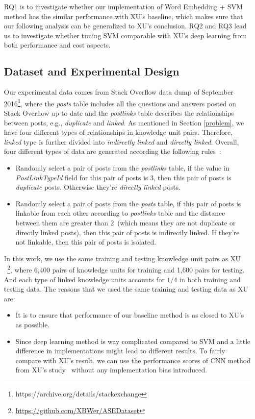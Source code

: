 \documentclass[sigconf]{acmart}
\theoremstyle{break}
\newcommand{\bi}{\begin{itemize}[leftmargin=0.4cm]}
\newcommand{\ei}{\end{itemize}}
\begin{document}
 RQ1 is to investigate whether our implementation of Word Embedding + SVM method has
 the similar performance with XU's baseline, which makes sure that our following 
 analysis can be generalized to XU's conclusion. RQ2 and RQ3 lead us to
 investigate whether tuning SVM comparable with XU's deep learning from both 
 performance and cost aspects.
 


\subsection{Dataset and Experimental Design}
Our experimental data comes from Stack Overflow data dump of 
September 2016\footnote{https://archive.org/details/stackexchange},
where the {\it posts} table includes all the questions and answers posted on Stack Overflow
up to date and the {\it postlinks} table describes the relationships between posts, 
e.g., {\it duplicate} and {\it linked}. As mentioned in Section
\ref{problem}, we have four different types of relationships in knowledge unit pairs.
Therefore,  {\it linked} type is further divided into {\it indirectly linked} and {\it directly linked}.
Overall, four different types of data are generated according the following rules~\cite{xu2016predicting}:
\bi
\item Randomly select a pair of posts from the {\it postlinks} table, if the value
in  {\it PostLinkTypeId} field for this pair of posts is $3$, then this pair of posts is {\it duplicate} posts. 
Otherwise they're {\it directly linked} posts.

\item Randomly select a pair of posts from the {\it posts} table, if this pair of posts is linkable from each other according to
{\it postlinks} table and the distance between them are greater than 2~(which means they are not duplicate or directly linked posts), then this pair of posts is indirectly linked. If they're
not linkable, then this pair of posts is {isolated}.
\ei

In this work, we use the same training and testing
knowledge unit pairs as XU ~\cite{xu2016predicting}\footnote{\url{https://github.com/XBWer/ASEDataset}}, 
where 6,400 pairs of  knowledge units for training and 1,600 pairs for testing. And each type 
of linked knowledge units accounts for $1/4$ in both training and testing data. The reasons that
we used the same training and testing data as XU are:
\bi
\item It is to ensure that  performance of our baseline method is as closed to XU's as possible.
\item Since deep learning method is way complicated compared to SVM and a little difference in implementations
might lead to different results. To fairly compare with XU's result, we can use the  performance scores
of CNN method from XU's study~\cite{xu2016predicting} without any implementation bias introduced.
\ei
\end{document}
